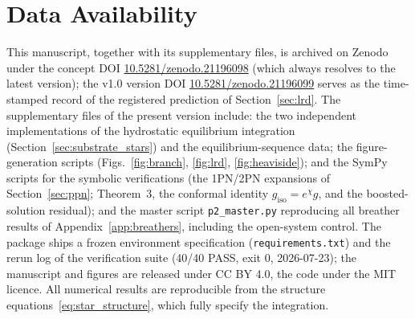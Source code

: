 \documentclass[11pt,a4paper]{article}
\theoremstyle{plain}
\theoremstyle{remark}
\begin{document}
\section*{Data Availability}
This manuscript, together with its supplementary files, is archived on Zenodo under the concept DOI \href{https://doi.org/10.5281/zenodo.21196098}{10.5281/zenodo.21196098} (which always resolves to the latest version); the v1.0 version DOI \href{https://doi.org/10.5281/zenodo.21196099}{10.5281/zenodo.21196099} serves as the time-stamped record of the registered prediction of Section~\ref{sec:lrd}. The supplementary files of the present version include: the two independent implementations of the hydrostatic equilibrium integration (Section~\ref{sec:substrate_stars}) and the equilibrium-sequence data; the figure-generation scripts (Figs.~\ref{fig:branch}, \ref{fig:lrd}, \ref{fig:heaviside}); and the SymPy scripts for the symbolic verifications (the 1PN/2PN expansions of Section~\ref{sec:ppn}; Theorem~3, the conformal identity $g_{\text{iso}} = e^{\chi}g$, and the boosted-solution residual); and the master script \texttt{p2\_master.py} reproducing all breather results of Appendix~\ref{app:breathers}, including the open-system control. The package ships a frozen environment specification (\texttt{requirements.txt}) and the rerun log of the verification suite (40/40 PASS, exit 0, 2026-07-23); the manuscript and figures are released under CC BY 4.0, the code under the MIT licence. All numerical results are reproducible from the structure equations~\eqref{eq:star_structure}, which fully specify the integration.
\end{document}
